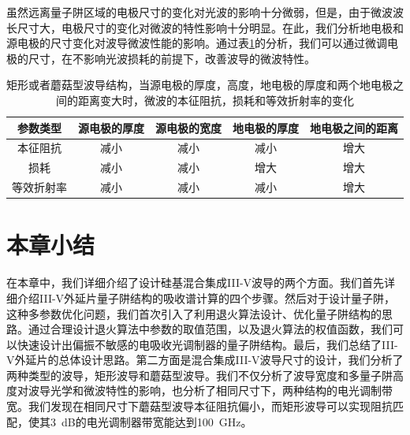 虽然远离量子阱区域的电极尺寸的变化对光波的影响十分微弱，但是，由于微波波长尺寸大，电极尺寸的变化对微波的特性影响十分明显。在此，我们分析地电极和源电极的尺寸变化对波导微波性能的影响。通过表\ref{rect_metal_influence}的分析，我们可以通过微调电极的尺寸，在不影响光波损耗的前提下，改善波导的微波特性。	
{
	\begin{table}[htb]
		\caption{矩形或者蘑菇型波导结构，当源电极的厚度，高度，地电极的厚度和两个地电极之间的距离变大时，微波的本征阻抗，损耗和等效折射率的变化}
		\label{rect_metal_influence}
		\centering
		\begin{tabular}[t]{ccccc}
			\hline
			参数类型 &源电极的厚度 & 源电极的宽度 & 地电极的厚度& 地电极之间的距离 \\
			\hline
			本征阻抗 &   减小 & 减小 & 减小 &增大\\
			损耗  &   减小 & 减小 & 增大 &增大\\
			等效折射率 &  减小 & 减小 & 减小 &增大\\
			\hline
		\end{tabular}
	\end{table}
}

			
\section{本章小结}
在本章中，我们详细介绍了设计硅基混合集成III-V波导的两个方面。我们首先详细介绍III-V外延片量子阱结构的吸收谱计算的四个步骤。然后对于设计量子阱，这种多参数优化问题，我们首次引入了利用退火算法设计、优化量子阱结构的思路。通过合理设计退火算法中参数的取值范围，以及退火算法的权值函数，我们可以快速设计出偏振不敏感的电吸收光调制器的量子阱结构。最后，我们总结了III-V外延片的总体设计思路。第二方面是混合集成III-V波导尺寸的设计，我们分析了两种类型的波导，矩形波导和蘑菇型波导。我们不仅分析了波导宽度和多量子阱高度对波导光学和微波特性的影响，也分析了相同尺寸下，两种结构的电光调制带宽。我们发现在相同尺寸下蘑菇型波导本征阻抗偏小，而矩形波导可以实现阻抗匹配，使其3~dB的电光调制器带宽能达到100~GHz。
